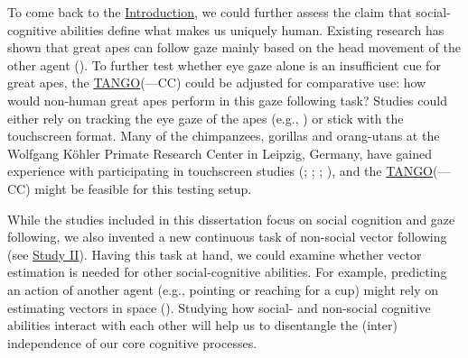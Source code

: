 \documentclass[
]{scrbook}
\begin{document}
To come back to the \hyperref[introduction]{Introduction}, we could further assess the claim that social-cognitive abilities define what makes us uniquely human. Existing research has shown that great apes can follow gaze mainly based on the head movement of the other agent (). To further test whether eye gaze alone is an insufficient cue for great apes, the \hyperref[acronyms_TANGO]{TANGO}(---CC) could be adjusted for comparative use: how would non-human great apes perform in this gaze following task? Studies could either rely on tracking the eye gaze of the apes (e.g., ) or stick with the touchscreen format. Many of the chimpanzees, gorillas and orang-utans at the Wolfgang Köhler Primate Research Center in Leipzig, Germany, have gained experience with participating in touchscreen studies (; ; ; ), and the \hyperref[acronyms_TANGO]{TANGO}(---CC) might be feasible for this testing setup.

While the studies included in this dissertation focus on social cognition and gaze following, we also invented a new continuous task of non-social vector following (see \hyperref[studyII]{Study II}). Having this task at hand, we could examine whether vector estimation is needed for other social-cognitive abilities. For example, predicting an action of another agent (e.g., pointing or reaching for a cup) might rely on estimating vectors in space (). Studying how social- and non-social cognitive abilities interact with each other will help us to disentangle the (inter) independence of our core cognitive processes.
\end{document}
